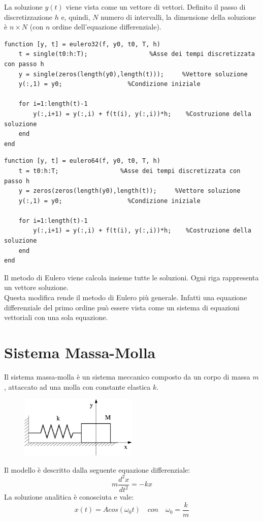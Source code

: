 La soluzione $y(t)$ viene vista come un vettore di vettori. Definito il passo di discretizzazione $h$ e, quindi, $N$ numero di intervalli, la dimensione della soluzione è $n\times N$ (con $n$ ordine dell'equazione differenziale).
\begin{verbatim}
function [y, t] = eulero32(f, y0, t0, T, h)
	t = single(t0:h:T);                 %Asse dei tempi discretizzata con passo h
	y = single(zeros(length(y0),length(t)));     %Vettore soluzione
	y(:,1) = y0;                  %Condizione iniziale
	
	for i=1:length(t)-1
		y(:,i+1) = y(:,i) + f(t(i), y(:,i))*h;    %Costruzione della soluzione
	end
end
\end{verbatim}
\begin{verbatim}
function [y, t] = eulero64(f, y0, t0, T, h)
	t = t0:h:T;                 %Asse dei tempi discretizzata con passo h
	y = zeros(zeros(length(y0),length(t));     %Vettore soluzione
	y(:,1) = y0;                  %Condizione iniziale
	
	for i=1:length(t)-1
		y(:,i+1) = y(:,i) + f(t(i), y(:,i))*h;    %Costruzione della soluzione
	end
end
\end{verbatim}
Il metodo di Eulero viene calcola insieme tutte le soluzioni. Ogni riga rappresenta un vettore soluzione.
\\Questa modifica rende il metodo di Eulero più generale. Infatti una equazione differenziale del primo ordine può essere vista come un sistema di equazioni vettoriali con una sola equazione.

\section{Sistema Massa-Molla}
Il sistema massa-molla è un sistema meccanico composto da un corpo di massa $m$, attaccato ad una molla con constante elastica $k$.
\begin{figure}[H]
	\centering   
	\includegraphics[width=0.5\textwidth]{img/massa-molla.png}
\end{figure} 
Il modello è descritto dalla seguente equazione differenziale:
\begin{equation*}
	m \dfrac{d^2x}{dt^2} = -kx	
\end{equation*}
La soluzione analitica è conosciuta e vale:
\begin{equation*}
	x(t) = A cos(\omega_0t) \quad con \quad \omega_0=\dfrac{k}{m}
\end{equation*}

